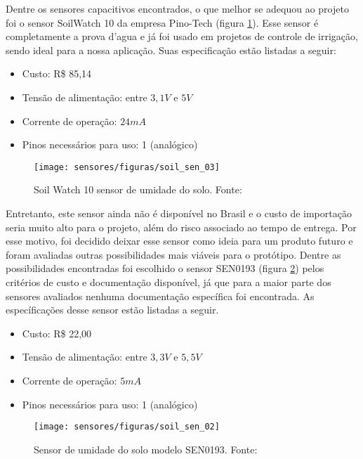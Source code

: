 	Dentre os sensores capacitivos encontrados, o que melhor se adequou ao projeto foi o sensor SoilWatch 10 da empresa Pino-Tech (figura \ref{soil_sen_03}). Esse sensor é completamente a prova d'agua e já foi usado em projetos de controle de irrigação, sendo ideal para a nossa aplicação. Suas especificação estão listadas a seguir:
	
	\begin{itemize}
				\item Custo: R\$ 85,14 
				\item Tensão de alimentação: entre $3,1V$ e $5V$
				\item Corrente de operação: $24 mA$
				\item Pinos necessários para uso: 1 (analógico)
	\end{itemize}

\begin{figure}[H]
		\centering
		\texttt{[image: sensores/figuras/soil\_sen\_03]}
		\caption{Soil Watch 10 sensor de umidade do solo. Fonte: \cite{bib_soil_sen_03}}
		\label{soil_sen_03}
	\end{figure}	

	Entretanto, este sensor ainda não é disponível no Brasil e o custo de importação seria muito alto para o projeto, além do risco associado ao tempo de entrega. Por esse motivo, foi decidido deixar esse sensor como ideia para um produto futuro e foram avaliadas outras possibilidades mais viáveis para o protótipo. Dentre as possibilidades encontradas foi escolhido o sensor SEN0193 (figura \ref{soil_sen_02}) pelos critérios de custo e documentação disponível, já que para a maior parte dos sensores avaliados nenhuma documentação específica foi encontrada. As específicações desse sensor estão listadas a seguir.
	
	\begin{itemize}
				\item Custo: R\$ 22,00
				\item Tensão de alimentação: entre $3,3V$ e $5,5V$
				\item Corrente de operação: $5 mA$
				\item Pinos necessários para uso: 1 (analógico)
	\end{itemize}
	
	\begin{figure}[H]
		\centering
		\texttt{[image: sensores/figuras/soil\_sen\_02]}
		\caption{Sensor de umidade do solo modelo SEN0193. Fonte: \cite{bib_soil_sen_02}}
		\label{soil_sen_02}
	\end{figure}	
	
